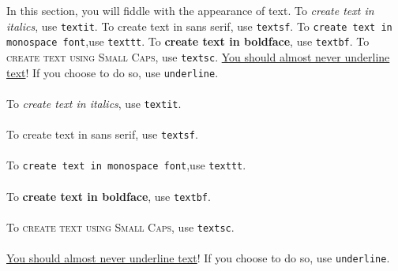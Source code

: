 In this section, you will fiddle with the appearance of text. To \textit{create text in italics}, use \texttt{textit}. To \textsf{create text in sans serif}, use \texttt{textsf}. To \texttt{create text in monospace font},use \texttt{texttt}. To \textbf{create text in boldface}, use \texttt{textbf}. To \textsc{create text using Small Caps}, use \texttt{textsc}. \underline{You should almost never underline text}! If you choose to do so, use \texttt{underline}.

        \paragraph{}To \textit{create text in italics}, use \texttt{textit}. 
        \paragraph{}To \textsf{create text in sans serif}, use \texttt{textsf}. 
        \paragraph{}To \texttt{create text in monospace font},use \texttt{texttt}. 
        \paragraph{}To \textbf{create text in boldface}, use \texttt{textbf}. 
        \paragraph{}To \textsc{create text using Small Caps}, use \texttt{textsc}. 
        \paragraph{}\underline{You should almost never underline text}! If you choose to do so, use \texttt{underline}.

